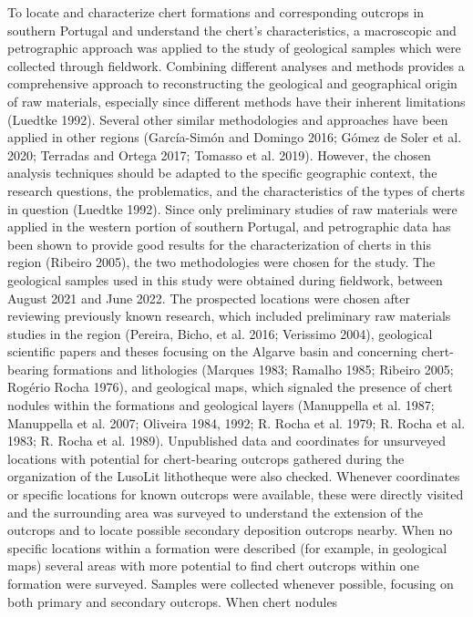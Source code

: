 \documentclass[
  a4paper,
  DIV=11,
  numbers=noendperiod]{scrreprt}
\begin{document}
To locate and characterize chert formations and corresponding outcrops
in southern Portugal and understand the chert's characteristics, a
macroscopic and petrographic approach was applied to the study of
geological samples which were collected through fieldwork. Combining
different analyses and methods provides a comprehensive approach to
reconstructing the geological and geographical origin of raw materials,
especially since different methods have their inherent limitations
(Luedtke 1992). Several other similar methodologies and approaches have
been applied in other regions (García-Simón and Domingo 2016; Gómez de
Soler et al. 2020; Terradas and Ortega 2017; Tomasso et al. 2019).
However, the chosen analysis techniques should be adapted to the
specific geographic context, the research questions, the problematics,
and the characteristics of the types of cherts in question (Luedtke
1992). Since only preliminary studies of raw materials were applied in
the western portion of southern Portugal, and petrographic data has been
shown to provide good results for the characterization of cherts in this
region (Ribeiro 2005), the two methodologies were chosen for the study.
The geological samples used in this study were obtained during
fieldwork, between August 2021 and June 2022. The prospected locations
were chosen after reviewing previously known research, which included
preliminary raw materials studies in the region (Pereira, Bicho, et al.
2016; Verissimo 2004), geological scientific papers and theses focusing
on the Algarve basin and concerning chert-bearing formations and
lithologies (Marques 1983; Ramalho 1985; Ribeiro 2005; Rogério Rocha
1976), and geological maps, which signaled the presence of chert nodules
within the formations and geological layers (Manuppella et al. 1987;
Manuppella et al. 2007; Oliveira 1984, 1992; R. Rocha et al. 1979; R.
Rocha et al. 1983; R. Rocha et al. 1989). Unpublished data and
coordinates for unsurveyed locations with potential for chert-bearing
outcrops gathered during the organization of the LusoLit lithotheque
were also checked. Whenever coordinates or specific locations for known
outcrops were available, these were directly visited and the surrounding
area was surveyed to understand the extension of the outcrops and to
locate possible secondary deposition outcrops nearby. When no specific
locations within a formation were described (for example, in geological
maps) several areas with more potential to find chert outcrops within
one formation were surveyed. Samples were collected whenever possible,
focusing on both primary and secondary outcrops. When chert nodules
\end{document}
